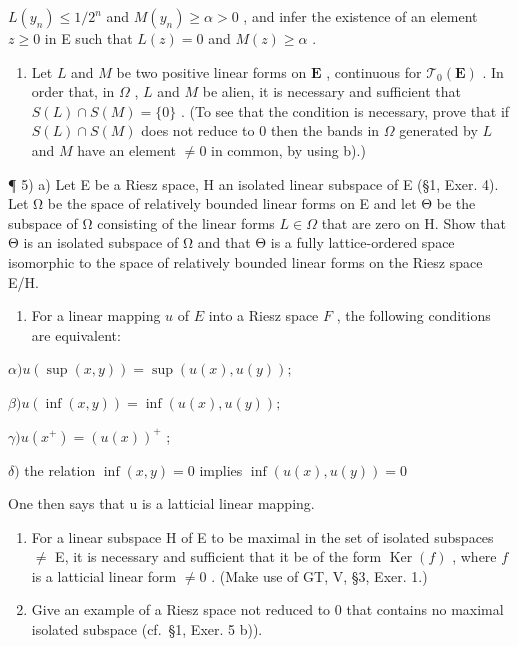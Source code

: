 \(L(y_{n}) \leqslant 1 / 2^{n}\) and \(M(y_{n}) \geqslant \alpha > 0\) , and infer the existence of an element \(z \geqslant 0\) in E such that \(L(z) = 0\) and \(M(z) \geqslant \alpha\) .

\begin{enumerate}
\def\labelenumi{\alph{enumi})}
\setcounter{enumi}{2}
\tightlist
\item
  Let \(L\) and \(M\) be two positive linear forms on \(\mathbf{E}\) , continuous for \(\mathcal{T}_0(\mathbf{E})\) . In order that, in \(\Omega\) , \(L\) and \(M\) be alien, it is necessary and sufficient that \(S(L) \cap S(M) = \{0\}\) . (To see that the condition is necessary, prove that if \(S(L) \cap S(M)\) does not reduce to 0 then the bands in \(\Omega\) generated by \(L\) and \(M\) have an element \(\neq 0\) in common, by using b).)
\end{enumerate}

¶ 5) a) Let E be a Riesz space, H an isolated linear subspace of E (§1, Exer. 4). Let Ω be the space of relatively bounded linear forms on E and let Θ be the subspace of Ω consisting of the linear forms \(L \in \Omega\) that are zero on H. Show that Θ is an isolated subspace of Ω and that Θ is a fully lattice-ordered space isomorphic to the space of relatively bounded linear forms on the Riesz space E/H.

\begin{enumerate}
\def\labelenumi{\alph{enumi})}
\setcounter{enumi}{1}
\tightlist
\item
  For a linear mapping \(u\) of \(E\) into a Riesz space \(F\) , the following conditions are equivalent:
\end{enumerate}

\(\alpha) u(\sup(x, y)) = \sup(u(x), u(y));\)

\(\beta) u(\inf(x, y)) = \inf(u(x), u(y));\)

\(\gamma) u(x^{+}) = (u(x))^{+}\) ;

\(\delta)\) the relation \(\inf (x,y) = 0\) implies \(\inf (u(x),u(y)) = 0\)

One then says that u is a latticial linear mapping.

\begin{enumerate}
\def\labelenumi{\alph{enumi})}
\setcounter{enumi}{2}
\item
  For a linear subspace H of E to be maximal in the set of isolated subspaces \(\neq\) E, it is necessary and sufficient that it be of the form \(\operatorname{Ker}(f)\) , where \(f\) is a latticial linear form \(\neq 0\) . (Make use of GT, V, §3, Exer. 1.)
\item
  Give an example of a Riesz space not reduced to 0 that contains no maximal isolated subspace (cf.~§1, Exer. 5 b)).
\end{enumerate}

